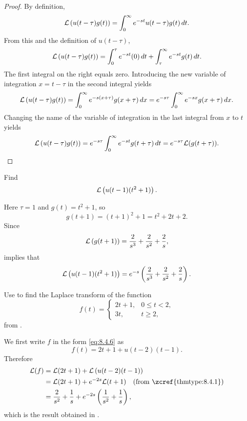 \begin{proof}
By definition,
\[
{\mathcal L}\left(u(t-\tau)g(t)\right)=\int_0^\infty e^{-st} u(t-\tau)g(t)\,
dt.
\]
From this and the definition of $u(t-\tau)$,
\[
{\mathcal L}\left(u(t-\tau)g(t)\right)=\int_0^\tau
e^{-st}(0)\,dt+\int_{\tau}^\infty e^{-st}g(t)\,dt.
\]
The first integral on the right equals zero.  Introducing the new variable
of integration $x=t-\tau$ in the second integral yields
\[
{\mathcal L}\left(u(t-\tau)g(t)\right)=\int_0^\infty e^{-s(x+\tau)}g(x+\tau)\,dx
=e^{-s\tau}\int_0^\infty e^{-sx} g(x+\tau)\,dx.
\]
Changing the name of the variable of integration in the last integral
from $x$ to $t$ yields
\[
{\mathcal L}\left(u(t-\tau)g(t)\right)
=e^{-s\tau}\int_0^\infty e^{-st} g(t+\tau)\,dt
=e^{-s\tau}{\mathcal L}(g(t+\tau)).
\]
\end{proof}

\begin{example}\label{example:8.4.2}
 Find
\[
{\mathcal L}\left(u(t-1)(t^2+1)\right).
\]
\end{example}

\begin{solution}
Here $\tau=1$ and $g(t)=t^2+1$, so
\[
g(t+1)=(t+1)^2+1=t^2+2t+2.
\]
Since
\[
{\mathcal L}\left(g(t+1)\right)=\frac{2}{s^3}+\frac{2}{s^2}+\frac{2}{s},
\]
 implies that
\[{\mathcal L}\left(u(t-1)(t^2+1)\right)
=e^{-s}\left(\frac{2}{s^3}+\frac{2}{s^2}+\frac{2}{s}\right).\qedhere
\]
\end{solution}

\begin{example}\label{example:8.4.3}
Use  to find the Laplace transform of the
function
\[
f(t)=\begin{cases} 2t+1,&0\le t<2,\\3t,&t\ge2,\end{cases}
\]
from .
\end{example}

\begin{solution}
We first write $f$ in the form \eqref{eq:8.4.6} as
\[
f(t)=2t+1+u(t-2)(t-1).
\]
Therefore
\begin{align*}
\laplace(f)
&=\laplace(2t+1)+\laplace\left(u(t-2)(t-1)\right)\\
&=\laplace(2t+1)+e^{-2s}\laplace(t+1)\quad\text{(from \zcref{thmtype:8.4.1}})\\
&=\frac{2}{s^2}+\frac{1}{s}+e^{-2s}\left(\frac{1}{s^2}+\frac{1}{s}\right),
\end{align*}
which is the result obtained in .
\end{solution}

